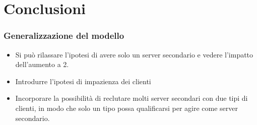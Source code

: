 \documentclass{beamer}
\begin{document}
\section{Conclusioni}



\begin{frame}
    \frametitle{Generalizzazione del modello}
    \begin{itemize}
        \item Si può rilassare l'ipotesi di avere solo un server secondario e vedere l'impatto dell'aumento a 2.
        \item Introdurre l'ipotesi di impazienza dei clienti
        \item Incorporare la possibilità di reclutare molti server secondari con due tipi di clienti, in modo che solo un tipo possa qualificarsi per agire come server secondario.
    \end{itemize}
\end{frame}
\end{document}
